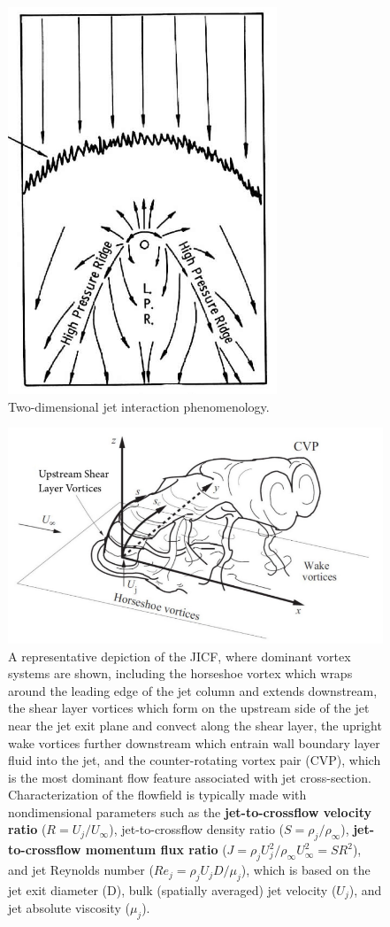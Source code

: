 \documentclass[12pt]{article}
\begin{document}
\begin{figure}[H]
    \centering
    \includegraphics[width=0.4\linewidth]{figs/Screenshot from 2025-06-26 09-59-36.png}
    \caption{Two-dimensional jet interaction phenomenology.}
    \label{fig:jet2d}
\end{figure}

\begin{figure}[H]
    \centering
    \includegraphics[width=0.8\linewidth]{figs/Screenshot from 2025-06-26 10-14-03.png}
    \caption{A representative depiction of the JICF, where dominant vortex systems are shown, including the horseshoe vortex which wraps around the leading edge of the jet column and extends downstream, the shear layer vortices which form on the upstream side of the jet near the jet exit plane and convect along the shear layer, the upright wake vortices further downstream which entrain wall boundary layer fluid into the jet, and the counter-rotating vortex pair (CVP), which is the most dominant flow feature associated with jet cross-section. Characterization of the flowfield is typically made with nondimensional parameters such as the \textbf{jet-to-crossflow velocity ratio} ($R = U_j /U_{\infty}$), jet-to-crossflow density ratio ($S = \rho_j/\rho_{\infty}$), \textbf{jet-to-crossflow momentum flux ratio} ($J = \rho_j U_j^2/\rho_{\infty} U_{\infty}^2 = SR^2$), and jet Reynolds number ($Re_j = \rho_j U_j D/\mu_j$), which is based on the jet exit diameter (D), bulk (spatially averaged) jet velocity ($U_j$), and jet absolute viscosity ($\mu_j$).}
    \label{fig:descr}
\end{figure}
\end{document}
